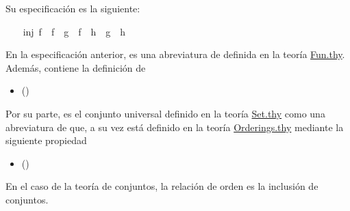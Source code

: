 \begin{isabellebody}
\begin{isamarkuptext}
  Su especificación es la siguiente:%
\end{isamarkuptext}\isamarkuptrue%
\isamarkupfalse%
\ \isanewline
\ \ {\isachardoublequoteopen}inj\ f\ {\isasymLongrightarrow}\ {\isacharparenleft}f\ {\isasymcirc}\ g\ {\isacharequal}\ f\ {\isasymcirc}\ h{\isacharparenright}\ {\isacharequal}\ {\isacharparenleft}g\ {\isacharequal}\ h{\isacharparenright}{\isachardoublequoteclose}\isanewline
%
\isadelimproof
%
\endisadelimproof
%
\isatagproof
{}\isamarkupfalse%
%
\endisatagproof
{\isafoldproof}%
%
\isadelimproof
%
\endisadelimproof
%
\begin{isamarkuptext}%
En la especificación anterior,  es una 
  abreviatura de  definida en la teoría
  \href{http://bit.ly/2XuPQx5}{Fun.thy}. Además, contiene la definición
  de 
  \begin{itemize}
    \item[]  \hfill ()
  \end{itemize} 
  Por su parte,  es el conjunto universal definido en la 
  teoría \href{http://bit.ly/2XtHCW6}{Set.thy} como una abreviatura de 
   que, a su vez está definido en la teoría 
  \href{http://bit.ly/2Xyj9Pe}{Orderings.thy} mediante la siguiente
  propiedad 
  \begin{itemize}
    \item[]  
      \hfill ()
  \end{itemize} 
  En el caso de la teoría de conjuntos, la relación de orden es la
  inclusión de conjuntos.


\end{isamarkuptext}
\end{isabellebody}
